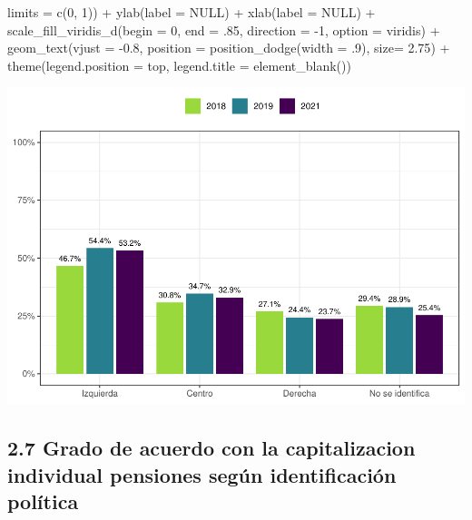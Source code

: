 \documentclass[
  12pt,
]{book}
\newenvironment{Shaded}{\begin{snugshade}}{\end{snugshade}}
\newcommand{\AttributeTok}[1]{\textcolor[rgb]{0.77,0.63,0.00}{#1}}
\newcommand{\ConstantTok}[1]{\textcolor[rgb]{0.00,0.00,0.00}{#1}}
\newcommand{\DecValTok}[1]{\textcolor[rgb]{0.00,0.00,0.81}{#1}}
\newcommand{\FloatTok}[1]{\textcolor[rgb]{0.00,0.00,0.81}{#1}}
\newcommand{\FunctionTok}[1]{\textcolor[rgb]{0.00,0.00,0.00}{#1}}
\newcommand{\NormalTok}[1]{#1}
\newcommand{\SpecialCharTok}[1]{\textcolor[rgb]{0.00,0.00,0.00}{#1}}
\newcommand{\StringTok}[1]{\textcolor[rgb]{0.31,0.60,0.02}{#1}}
\begin{document}
\begin{Shaded}
\begin{Highlighting}[]
                       \AttributeTok{limits =} \FunctionTok{c}\NormalTok{(}\DecValTok{0}\NormalTok{, }\DecValTok{1}\NormalTok{)) }\SpecialCharTok{+}
    \FunctionTok{ylab}\NormalTok{(}\AttributeTok{label =} \ConstantTok{NULL}\NormalTok{) }\SpecialCharTok{+}
    \FunctionTok{xlab}\NormalTok{(}\AttributeTok{label =} \ConstantTok{NULL}\NormalTok{) }\SpecialCharTok{+}
    \FunctionTok{scale\_fill\_viridis\_d}\NormalTok{(}\AttributeTok{begin =} \DecValTok{0}\NormalTok{, }\AttributeTok{end =}\NormalTok{ .}\DecValTok{85}\NormalTok{, }\AttributeTok{direction =} \SpecialCharTok{{-}}\DecValTok{1}\NormalTok{, }\AttributeTok{option =} \StringTok{\textquotesingle{}viridis\textquotesingle{}}\NormalTok{) }\SpecialCharTok{+}
    \FunctionTok{geom\_text}\NormalTok{(}\AttributeTok{vjust =} \SpecialCharTok{{-}}\FloatTok{0.8}\NormalTok{,}
              \AttributeTok{position =} \FunctionTok{position\_dodge}\NormalTok{(}\AttributeTok{width =}\NormalTok{ .}\DecValTok{9}\NormalTok{),}
              \AttributeTok{size=} \FloatTok{2.75}\NormalTok{) }\SpecialCharTok{+}
    \FunctionTok{theme}\NormalTok{(}\AttributeTok{legend.position =} \StringTok{\textquotesingle{}top\textquotesingle{}}\NormalTok{,}
          \AttributeTok{legend.title =} \FunctionTok{element\_blank}\NormalTok{())}
\end{Highlighting}
\end{Shaded}

\includegraphics{reporte-elsoc_files/figure-latex/unnamed-chunk-20-1.pdf}

\hypertarget{grado-de-acuerdo-con-la-capitalizacion-individual-pensiones-seguxfan-identificaciuxf3n-poluxedtica}{%
\subsection{2.7 Grado de acuerdo con la capitalizacion individual pensiones según identificación política}\label{grado-de-acuerdo-con-la-capitalizacion-individual-pensiones-seguxfan-identificaciuxf3n-poluxedtica}}
\end{document}
